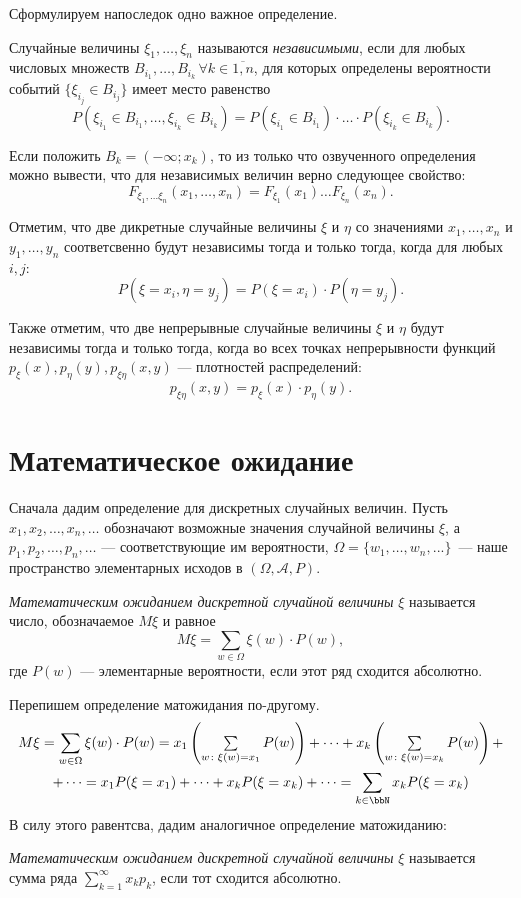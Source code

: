 Сформулируем напоследок одно важное определение.
\begin{defn} Случайные величины $\xi_1,\dots,\xi_n$ называются \textit{независимыми}, если для любых числовых множеств $B_{i_1},\dots,  B_{i_k}\, \forall k\in\overline{1,n}$, для которых определены вероятности событий $\{\xi_{i_j}\in B_{i_j}\}$ имеет место равенство
$$
P(\xi_{i_1}\in B_{i_1},\dots, \xi_{i_k} \in B_{i_k})=P(\xi_{i_1}\in B_{i_1})\cdot\dots\cdot P(\xi_{i_k} \in B_{i_k}).
$$
\end{defn}

Если положить $B_k=(-\infty;x_k)$, то из только что озвученного определения можно вывести, что для независимых величин верно следующее свойство:
$$
F_{\xi_1,\dots\xi_n}(x_1,\dots,x_n)=F_{\xi_1}(x_1)\dots F_{\xi_n}(x_n).
$$

Отметим, что две дикретные случайные величины $\xi$ и $\eta$ со значениями $x_1,\dots,x_n$ и $y_1,\dots,y_n$ соответсвенно будут независимы тогда и только тогда, когда для любых $i,j$:
$$
P(\xi = x_i, \eta = y_j) = P (\xi = x_i)\cdot P(\eta=y_j).
$$

Также отметим, что две непрерывные случайные величины $\xi$ и $\eta$ будут независимы тогда и только тогда, когда во всех точках непрерывности функций $p_\xi(x),p_\eta(y),p_{\xi\eta}(x,y)$ --- плотностей распределений:
$$
p_{\xi\eta}(x,y)=p_\xi(x)\cdot p_\eta(y).
$$ 

\section{Математическое ожидание}

Сначала дадим определение для дискретных случайных величин. Пусть $x_1,x_2,\dots,x_n,\dots$ обозначают возможные значения случайной величины $\xi$, а $p_1,p_2,\dots,p_n,\dots$ --- соответствующие им вероятности, $\Omega = \{w_1,\dots, w_n,...\}$~--- наше пространство элементарных исходов в $(\Omega,\mathcal A, P)$.
\begin{defn}\label{teorver1}
\textit{Математическим ожиданием дискретной случайной величины} $\xi$ называется число, обозначаемое $M\xi$ и равное
\begin{equation}
M\xi = \sum_{w \in \Omega} \xi(w)\cdot P(w),
\end{equation}
где $P(w)$ --- элементарные вероятности, если этот ряд сходится абсолютно.
\end{defn}
Перепишем определение матожидания по-другому.
\begin{multline*}
M\xi=\sum_{w \in \Omega} \xi(w)\cdot P(w)=x_1\left(\textstyle\sum\limits_{w\colon \xi(w)=x_1} P(w)\right)+\dots+x_k\left(\textstyle\sum\limits_{w\colon \xi(w)=x_k} P(w)\right)+\\+\dots =x_1P(\xi=x_1)+\dots+ x_kP(\xi=x_k)+\dots=\sum_{k\in \bbN} x_kP(\xi=x_k)
\end{multline*}
В силу этого равентсва, дадим аналогичное определение матожиданию:
\begin{defnn}\label{teorver1s}
\textit{Математическим ожиданием дискретной случайной величины} $\xi$ называется сумма ряда $\sum\limits_{k=1}^{\infty}x_k p_k$, если тот сходится абсолютно.
\end{defnn}


